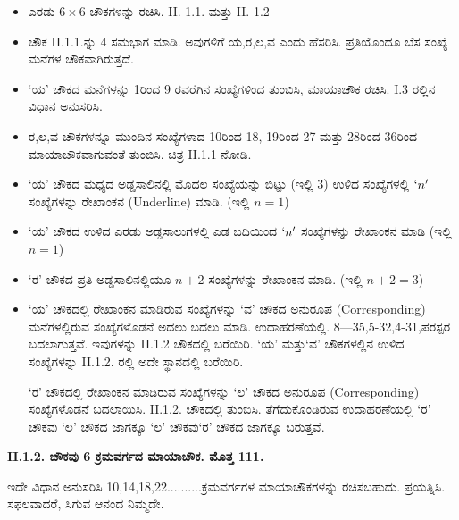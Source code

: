 \begin{itemize}
	\item ಎರಡು $6 \times 6$ ಚೌಕಗಳನ್ನು ರಚಿಸಿ. II. 1.1. ಮತ್ತು II. 1.2
	\item ಚೌಕ II.1.1.ನ್ನು 4 ಸಮಭಾಗ ಮಾಡಿ. ಅವುಗಳಿಗೆ ಯ,ರ,ಲ,ವ ಎಂದು ಹೆಸರಿಸಿ. ಪ್ರತಿಯೊಂದೂ ಬೆಸ ಸಂಖ್ಯೆ ಮನೆಗಳ ಚೌಕವಾಗಿರುತ್ತದೆ.
	\item ‘ಯ’ ಚೌಕದ ಮನೆಗಳನ್ನು 1ರಿಂದ 9 ರವರೆಗಿನ ಸಂಖ್ಯೆಗಳಿಂದ ತುಂಬಿಸಿ, ಮಾಯಾಚೌಕ ರಚಿಸಿ. I.3 ರಲ್ಲಿನ ವಿಧಾನ ಅನುಸರಿಸಿ.
	\item ರ,ಲ,ವ ಚೌಕಗಳನ್ನೂ ಮುಂದಿನ ಸಂಖ್ಯೆಗಳಾದ 10ರಿಂದ 18, 19ರಿಂದ 27 ಮತ್ತು 28ರಿಂದ 36ರಿಂದ ಮಾಯಾಚೌಕವಾಗುವಂತೆ ತುಂಬಿಸಿ. ಚಿತ್ರ II.1.1 ನೋಡಿ.
	\item ‘ಯ’ ಚೌಕದ ಮಧ್ಯದ ಅಡ್ಡಸಾಲಿನಲ್ಲಿ ಮೊದಲ ಸಂಖ್ಯೆಯನ್ನು ಬಿಟ್ಟು (ಇಲ್ಲಿ 3) ಉಳಿದ ಸಂಖ್ಯೆಗಳಲ್ಲಿ $`n'$ ಸಂಖ್ಯೆಗಳನ್ನು ರೇಖಾಂಕನ (Underline) ಮಾಡಿ. (ಇಲ್ಲಿ $n=1$)
	\item ‘ಯ’ ಚೌಕದ ಉಳಿದ ಎರಡು ಅಡ್ಡಸಾಲುಗಳಲ್ಲಿ ಎಡ ಬದಿಯಿಂದ $`n'$ ಸಂಖ್ಯೆಗಳನ್ನು ರೇಖಾಂಕನ ಮಾಡಿ (ಇಲ್ಲಿ $n=1$)
	\item ‘ರ’ ಚೌಕದ ಪ್ರತಿ ಅಡ್ಡಸಾಲಿನಲ್ಲಿಯೂ $n+2$ ಸಂಖ್ಯೆಗಳನ್ನು ರೇಖಾಂಕನ ಮಾಡಿ. (ಇಲ್ಲಿ $n+2=3$)
	\item ‘ಯ’ ಚೌಕದಲ್ಲಿ ರೇಖಾಂಕನ ಮಾಡಿರುವ ಸಂಖ್ಯೆಗಳನ್ನು ‘ವ’ ಚೌಕದ ಅನುರೂಪ (Corresponding) ಮನೆಗಳಲ್ಲಿರುವ ಸಂಖ್ಯೆಗಳೊಡನೆ ಅದಲು ಬದಲು ಮಾಡಿ. ಉದಾಹರಣೆಯಲ್ಲಿ. 8---35,5-32,4-31,ಪರಸ್ಪರ ಬದಲಾಗುತ್ತವೆ. ಇವುಗಳನ್ನು II.1.2 ಚೌಕದಲ್ಲಿ ಬರೆಯಿರಿ. ‘ಯ’ ಮತ್ತು‘ವ’ ಚೌಕಗಳಲ್ಲಿನ ಉಳಿದ ಸಂಖ್ಯೆಗಳನ್ನು II.1.2. ರಲ್ಲಿ ಅದೇ ಸ್ಥಾನದಲ್ಲಿ ಬರೆಯಿರಿ.

	‘ರ’ ಚೌಕದಲ್ಲಿ ರೇಖಾಂಕನ ಮಾಡಿರುವ ಸಂಖ್ಯೆಗಳನ್ನು ‘ಲ’ ಚೌಕದ ಅನುರೂಪ (Corresponding) ಸಂಖ್ಯೆಗಳೊಡನೆ ಬದಲಾಯಿಸಿ. II.1.2. ಚೌಕದಲ್ಲಿ ತುಂಬಿಸಿ. ತೆಗೆದುಕೊಂಡಿರುವ ಉದಾಹರಣೆಯಲ್ಲಿ ‘ರ’ ಚೌಕವು ‘ಲ’ ಚೌಕದ ಜಾಗಕ್ಕೂ ‘ಲ’ ಚೌಕವು‘ರ’ ಚೌಕದ ಜಾಗಕ್ಕೂ ಬರುತ್ತವೆ.
\end{itemize}

\textbf {II.1.2. ಚೌಕವು 6 ಕ್ರಮವರ್ಗದ ಮಾಯಾಚೌಕ. ಮೊತ್ತ 111.}

ಇದೇ ವಿಧಾನ ಅನುಸರಿಸಿ 10,14,18,22..........ಕ್ರಮವರ್ಗಗಳ ಮಾಯಾಚೌಕಗಳನ್ನು ರಚಿಸಬಹುದು. ಪ್ರಯತ್ನಿಸಿ. ಸಫಲವಾದರೆ, ಸಿಗುವ ಆನಂದ ನಿಮ್ಮದೇ.

